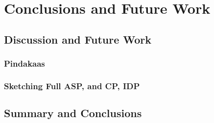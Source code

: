 \chapter{Conclusions and Future Work}\label{ch:conclusions}

\section{Discussion and Future Work}

\subsection{Pindakaas}

\subsection{Sketching Full ASP, and CP, IDP}

\section{Summary and Conclusions}


\cleardoublepage

